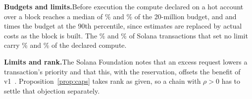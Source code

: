 \documentclass[conference,compsoc]{IEEEtran}
\numberwithin{equation}{section}
\theoremstyle{plain}
\theoremstyle{definition}
\theoremstyle{remark}
\newcommand{\runin}[1]{\par\smallskip\noindent\textbf{#1.}\enspace}
\begin{document}
\runin{Budgets and limits}Before execution the compute declared on a hot account over a block reaches a median of \declLimMedA\% and \declLimMedB\% of the 20-million budget, and \declLimNinetyA{} and \declLimNinetyB{} times the budget at the 90th percentile, since estimates are replaced by actual costs as the block is built. The \% and \% of Solana transactions that set no limit carry \% and \% of the declared compute.

\runin{Limits and rank}The Solana Foundation notes that an excess request lowers a transaction's priority and that this, with the reservation, offsets the benefit of v1~\cite{natale2026resource}. Proposition~\ref{prop:caps} takes rank as given, so a chain with $\rho > 0$ has to settle that objection separately.
\end{document}
